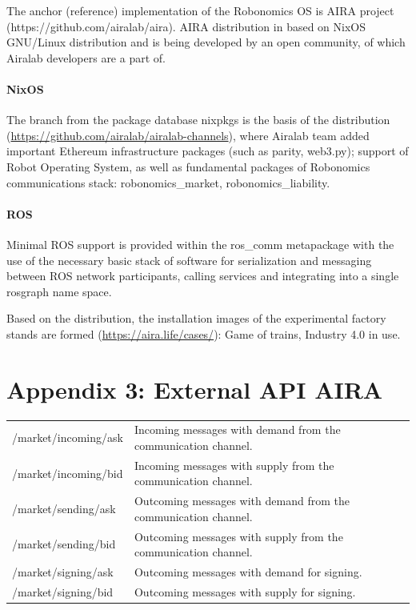 \documentclass{article}
\begin{document}
The anchor (reference) implementation of the Robonomics OS is AIRA project (https://github.com/airalab/aira). AIRA distribution in based on NixOS GNU/Linux distribution and is being developed by an open community, of which Airalab developers are a part of.

\paragraph{NixOS}

The branch from the package database nixpkgs is the basis of the distribution (\url{https://github.com/airalab/airalab-channels}), where Airalab team added important Ethereum infrastructure packages (such as parity, web3.py); support of Robot Operating System, as well as fundamental packages of Robonomics communications stack: robonomics\_market, robonomics\_liability.

\paragraph*{ROS}

Minimal ROS support is provided within the ros\_comm metapackage with the use of the necessary basic stack of software for serialization and messaging between ROS network participants, calling services and integrating into a single rosgraph name space.
	
Based on the distribution, the installation images of the experimental factory stands are formed (\url{https://aira.life/cases/}): Game of trains, Industry 4.0 in use.

\section*{Appendix 3: External API AIRA}

\begin{tabular}{ l |l}
	/market/incoming/ask & Incoming messages with demand from the communication channel. \\
	/market/incoming/bid & Incoming messages with supply from the communication channel. \\
	/market/sending/ask & Outcoming messages with demand from the communication channel. \\
	/market/sending/bid & Outcoming messages with supply from the communication channel. \\
	/market/signing/ask & Outcoming messages with demand for signing. \\
	/market/signing/bid & Outcoming messages with supply for signing. \\
\end{tabular}
\end{document}
